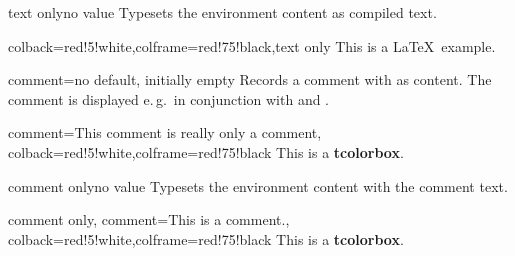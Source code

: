 \clearpage
\begin{docTcbKey}{text only}{}{no value}
  Typesets the environment content as compiled text.
\begin{dispExample}
\begin{tcblisting}{colback=red!5!white,colframe=red!75!black,text only}
This is a \LaTeX\ example.
\end{tcblisting}
\end{dispExample}
\end{docTcbKey}



\begin{docTcbKey}{comment}{=}{no default, initially empty}
  Records a comment with  as content. The comment is displayed
   e.\,g.\ in conjunction with 
  and .
\begin{dispExample}
\begin{tcblisting}{comment={This comment is really only a comment},
  colback=red!5!white,colframe=red!75!black}
This is a \textbf{tcolorbox}.
\end{tcblisting}
\end{dispExample}
\end{docTcbKey}


\begin{docTcbKey}[][doc new=2014-11-17]{comment only}{}{no value}
  Typesets the environment content with the comment text.
\begin{dispExample}
\begin{tcblisting}{comment only,
  comment={This is a comment.},
  colback=red!5!white,colframe=red!75!black}
This is a \textbf{tcolorbox}.
\end{tcblisting}
\end{dispExample}
\end{docTcbKey}






